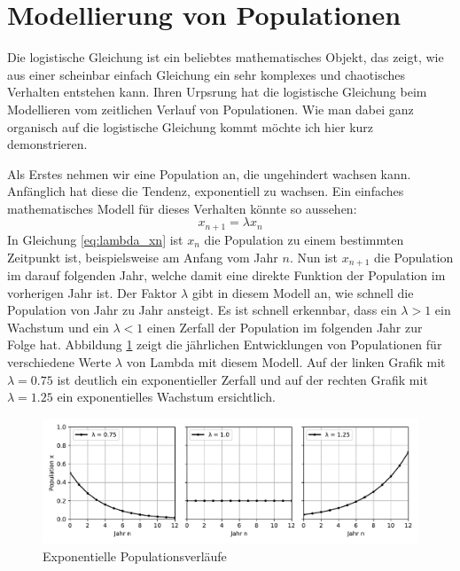 %
%
%
\section{Modellierung von Populationen\label{logistic:section:einleitung}}

Die logistische Gleichung ist ein beliebtes mathematisches Objekt,
das zeigt, wie aus einer scheinbar einfach Gleichung
ein sehr komplexes und chaotisches Verhalten entstehen kann. 
Ihren Urpsrung hat die logistische Gleichung beim Modellieren
vom zeitlichen Verlauf von Populationen. 
Wie man dabei ganz organisch auf die logistische Gleichung 
kommt möchte ich hier kurz demonstrieren. 

Als Erstes nehmen wir eine Population an, 
die ungehindert wachsen kann. 
Anfänglich hat diese die Tendenz, exponentiell zu wachsen. 
Ein einfaches mathematisches Modell für dieses Verhalten
könnte so aussehen:
\begin{equation}
    \label{eq:lambda_xn}
    x_{n+1} = \lambda x_{n}
\end{equation}
In Gleichung \ref{eq:lambda_xn} ist $x_{n}$ die Population zu einem bestimmten Zeitpunkt ist, 
beispielsweise am Anfang vom Jahr $n$. 
Nun ist $x_{n+1}$ die Population im darauf folgenden Jahr, 
welche damit eine direkte Funktion der Population im vorherigen
Jahr ist. 
Der Faktor $\lambda$ gibt in diesem Modell an, 
wie schnell die Population von Jahr zu Jahr ansteigt. 
Es ist schnell erkennbar, 
dass ein $\lambda > 1$ ein Wachstum und
ein $\lambda < 1$ einen Zerfall
der Population im folgenden Jahr zur Folge hat. 
Abbildung \ref{fig:pop_exp} zeigt die jährlichen
Entwicklungen von Populationen für verschiedene
Werte $\lambda$ von Lambda mit diesem Modell.
Auf der linken Grafik mit $\lambda = 0.75$ ist deutlich
ein exponentieller Zerfall und auf 
der rechten Grafik mit $\lambda = 1.25$
ein exponentielles Wachstum ersichtlich.
\begin{figure}
    \includegraphics[width=\linewidth]{papers/logistic/figures/pop_exp.pdf}
    \caption{Exponentielle Populationsverläufe}
    \label{fig:pop_exp}
\end{figure}

